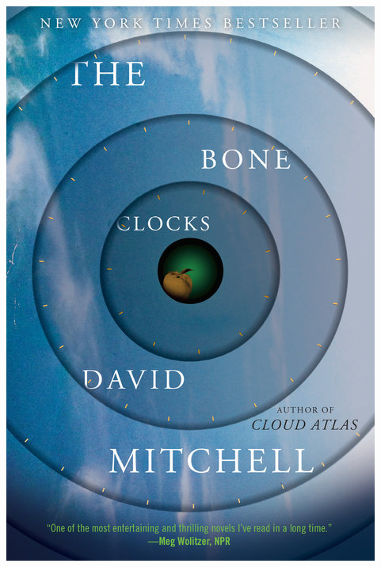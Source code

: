 \documentclass{tufte-handout}
\makeatletter
\newcommand{\varcaption}[2][0pt]{%
  \gsetlength{\@tufte@caption@vertical@offset}{-#1}%
  \gdef\@tufte@stored@varcaption{#2}%
}
\gdef\@tufte@stored@varcaption{} %
\makeatother
\begin{document}
\begin{marginfigure}[-55\baselineskip]
   \includegraphics[width=\linewidth]{images/bone_clocks.jpg}
   \varcaption{\href{https://www.penguinrandomhouse.com/books/208717/the-bone-clocks-by-david-mitchell/9780812976823/}{Publisher Link}, \href{https://www.amazon.com/Bone-Clocks-Novel-David-Mitchell/dp/0812976827}{Amazon Link}}
\end{marginfigure}
\end{document}
